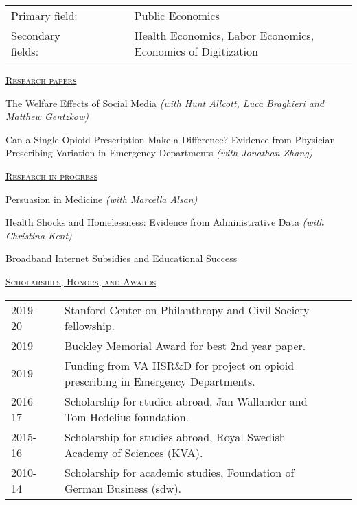 \documentclass[letterpaper,11pt]{article}
\begin{document}
\noindent\begin{tabular}{@{}l@{}lll@{}cl}
Primary field: &&&&& Public Economics \\
Secondary fields: &&&&& Health Economics, Labor Economics, Economics of Digitization
\end{tabular}


\bigskip
 
\underline {\textsc{Research papers}}



The Welfare Effects of Social Media \textit{(with Hunt Allcott, Luca Braghieri and Matthew Gentzkow)}

Can a Single Opioid Prescription Make a Difference? Evidence from Physician Prescribing Variation in Emergency Departments \textit{(with Jonathan Zhang)}

\bigskip


\underline {\textsc{Research in progress}}

Persuasion in Medicine \textit{(with Marcella Alsan)}

Health Shocks and Homelessness: Evidence from Administrative Data \textit{(with Christina Kent)}

Broadband Internet Subsidies and Educational Success



\newpage
 
\underline {\textsc{Scholarships, Honors, and Awards}}

\begin{tabular}{@{}l@{}cl@{}cl}
2019-20 & & Stanford Center on Philanthropy and Civil Society fellowship. \\
2019 & & Buckley Memorial Award for best 2nd year paper. \\
2019 & & Funding from VA HSR\&D for project on opioid prescribing in Emergency Departments. \\
2016-17 & & Scholarship for studies abroad, Jan Wallander and Tom Hedelius foundation. \\
2015-16 & & Scholarship for studies abroad, Royal Swedish Academy of Sciences (KVA).  \\
2010-14 & & Scholarship for academic studies, Foundation of German Business (sdw).
\end{tabular}
 
 \bigskip
 
\end{document}
